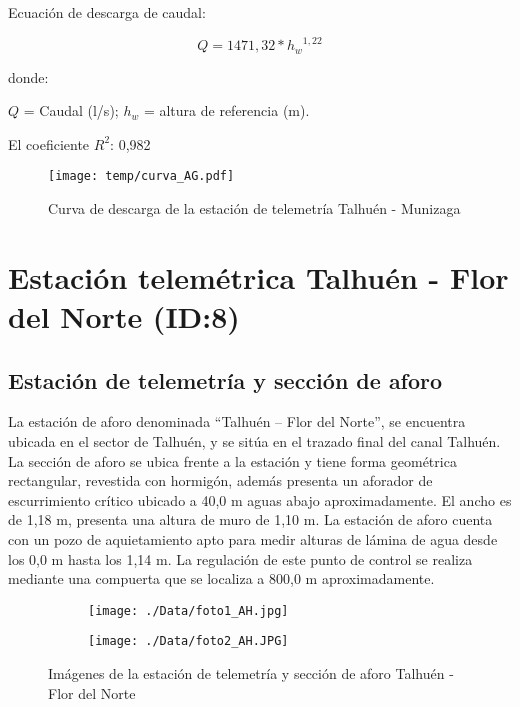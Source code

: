 \documentclass[]{article}
\begin{document}
Ecuación de descarga de caudal:

\[Q = 1471,32*{h_w}^{1,22}\]

donde:

\(Q\) = Caudal (l/s); \(h_w\) = altura de referencia (m).

El coeficiente \(R^2\): 0,982

\begin{figure}[H]
  \centering
  \texttt{[image: temp/curva\_AG.pdf]}
\caption{Curva de descarga de la estación de telemetría Talhuén - Munizaga}
\label{fig:Curva_AG}
\end{figure}

\clearpage
\section{Estación telemétrica Talhuén - Flor del Norte (ID:8)}

\subsection{Estación de telemetría y sección de aforo}

La estación de aforo denominada ``Talhuén – Flor del Norte'', se encuentra ubicada en el sector de Talhuén, y se sitúa en el trazado final del canal Talhuén. La sección de aforo se ubica frente a la estación y tiene forma geométrica rectangular, revestida con hormigón, además presenta un aforador de escurrimiento crítico ubicado a 40,0 m aguas abajo aproximadamente. El ancho es de 1,18 m, presenta una altura de muro de 1,10 m. La estación de aforo  cuenta con un pozo de aquietamiento apto para medir alturas de lámina de agua desde los 0,0 m hasta los 1,14 m. La regulación de este punto de control se realiza mediante una compuerta que se localiza a 800,0 m aproximadamente.

\begin{figure}[H]
  \centering
\begin{subfigure}{.49\textwidth}
  \texttt{[image: ./Data/foto1\_AH.jpg]}
\end{subfigure}
\hfill
\begin{subfigure}{.49\textwidth}
  \texttt{[image: ./Data/foto2\_AH.JPG]}
\end{subfigure}
\caption{Imágenes de la estación de telemetría y sección de aforo Talhuén - Flor del Norte}
\label{fig:fotos_8}
\end{figure}
\end{document}

